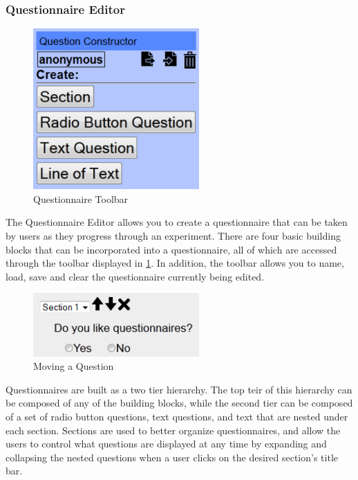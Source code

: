 \documentclass[article]{ij4uq}              %
\begin{document}
\subsubsection {Questionnaire Editor}

\begin{figure}[h!]
 \centering
 \includegraphics[width=2.5in]{figures/question_toolbar.png}
 \caption{Questionnaire Toolbar}
 \label{fig:questTool}
\end{figure}
\FloatBarrier

The Questionnaire Editor allows you to create a questionnaire that can be taken by users as they progress through an experiment. There are four basic building blocks that can be incorporated into a questionnaire, all of which are accessed through the toolbar displayed in \ref{fig:questTool}. In addition, the toolbar allows you to name, load, save and clear the questionnaire currently being edited.

\begin{figure}[h!]
 \centering
 \includegraphics[width=2.5in]{figures/question_edit.png}
 \caption{Moving a Question}
 \label{fig:questEdit}
\end{figure}
\FloatBarrier

Questionnaires are built as a two tier hierarchy.  The top teir of this hierarchy can be composed of any of the building blocks, while the second tier can be composed of a set of radio button questions, text questions, and text that are nested under each section.  Sections are used to better organize questionnaires, and allow the users to control what questions are displayed at any time by expanding and collapsing the nested questions when a user clicks on the desired section's title bar.  
\end{document}
